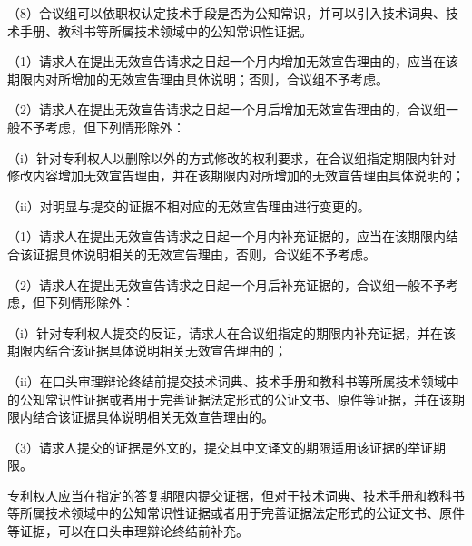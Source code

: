 {\setlength{\parindent}{17.1bp}（8）合议组可以依职权认定技术手段是否为公知常识，并可以引入技术词典、技术手册、教科书等所属技术领域中的公知常识性证据。\par}

{\setlength{\parindent}{17.1bp}（1）请求人在提出无效宣告请求之日起一个月内增加无效宣告理由的，应当在该期限内对所增加的无效宣告理由具体说明；否则，合议组不予考虑。\par}

{\setlength{\parindent}{17.1bp}（2）请求人在提出无效宣告请求之日起一个月后增加无效宣告理由的，合议组一般不予考虑，但下列情形除外：\par}

{\setlength{\parindent}{17.1bp}（i）针对专利权人以删除以外的方式修改的权利要求，在合议组指定期限内针对修改内容增加无效宣告理由，并在该期限内对所增加的无效宣告理由具体说明的；\par}

{\setlength{\parindent}{17.1bp}（ii）对明显与提交的证据不相对应的无效宣告理由进行变更的。\par}

{\setlength{\parindent}{17.1bp}（1）请求人在提出无效宣告请求之日起一个月内补充证据的，应当在该期限内结合该证据具体说明相关的无效宣告理由，否则，合议组不予考虑。\par}

{\setlength{\parindent}{17.1bp}（2）请求人在提出无效宣告请求之日起一个月后补充证据的，合议组一般不予考虑，但下列情形除外：\par}

{\setlength{\parindent}{17.1bp}（i）针对专利权人提交的反证，请求人在合议组指定的期限内补充证据，并在该期限内结合该证据具体说明相关无效宣告理由的；\par}

{\setlength{\parindent}{17.1bp}（ii）在口头审理辩论终结前提交技术词典、技术手册和教科书等所属技术领域中的公知常识性证据或者用于完善证据法定形式的公证文书、原件等证据，并在该期限内结合该证据具体说明相关无效宣告理由的。\par}

{\setlength{\parindent}{17.1bp}（3）请求人提交的证据是外文的，提交其中文译文的期限适用该证据的举证期限。\par}

专利权人应当在指定的答复期限内提交证据，但对于技术词典、技术手册和教科书等所属技术领域中的公知常识性证据或者用于完善证据法定形式的公证文书、原件等证据，可以在口头审理辩论终结前补充。

